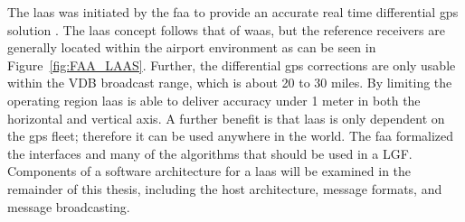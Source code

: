 The \ac{laas} was initiated by the \ac{faa} to provide an accurate real time differential \ac{gps} solution . The \ac{laas} concept follows that of \ac{waas}, but the reference receivers are generally located within the airport environment as can be seen in Figure~\ref{fig:FAA_LAAS}.  Further, the differential \ac{gps} corrections are only usable within the VDB broadcast range, which is about 20 to 30 miles.  By limiting the operating region \ac{laas} is able to deliver accuracy under 1 meter in both the horizontal and vertical axis\cite[]{FAA_LAAS}. A further benefit is that \ac{laas} is only dependent on the \ac{gps} fleet; therefore it can be used anywhere in the world.  The \ac{faa} formalized the interfaces and many of the algorithms that should be used in a LGF. Components of a software architecture for a \ac{laas} will be examined in the remainder of this thesis, including the host architecture, message formats, and message broadcasting.
